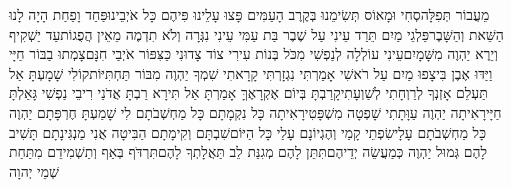 \documentclass[../main/main.tex]{subfiles}
\begin{document}
\begin{multicols*}{\ncols}
מֵעֲבוֹר תְּפִלָּה\PreVerseSpace{}סְחִי וּמָאוֹס תְּשִׂימֵנוּ בְּקֶרֶב הָעַמִּים \ClosedSection{}פָּצוּ עָלֵינוּ פִּיהֶם כָּל אֹיְבֵינוּ\PreVerseSpace{}פַּחַד וָפַחַת הָיָה לָנוּ הַשֵּׁאת וְהַשָּׁבֶר\PreVerseSpace{}פַּלְגֵי מַיִם תֵּרַד עֵינִי עַל שֶׁבֶר בַּת עַמִּי \ClosedSection{}עֵינִי נִגְּרָה וְלֹא תִדְמֶה מֵאֵין הֲפֻגוֹת\PreVerseSpace{}עַד יַשְׁקִיף וְיֵרֶא יַהְוֶה מִשָּׁמָיִם\PreVerseSpace{}עֵינִי עוֹלְלָה לְנַפְשִׁי מִכֹּל בְּנוֹת עִירִי \ClosedSection{}צוֹד צָדוּנִי כַּצִּפּוֹר אֹיְבַי חִנָּם\PreVerseSpace{}צָמְתוּ בַבּוֹר חַיָּי וַיַּדּוּ אֶבֶן בִּי\PreVerseSpace{}צָפוּ מַיִם עַל רֹאשִׁי אָמַרְתִּי נִגְזָרְתִּי \ClosedSection{}קָרָאתִי שִׁמְךָ יַהְוֶה מִבּוֹר תַּחְתִּיּוֹת\PreVerseSpace{}קוֹלִי שָׁמָעְתָּ אַל תַּעְלֵם אָזְנְךָ לְרַוְחָתִי לְשַׁוְעָתִי\PreVerseSpace{}קָרַבְתָּ בְּיוֹם אֶקְרָאֶךָּ אָמַרְתָּ אַל תִּירָא \ClosedSection{}רַבְתָּ אֲדֹנַי רִיבֵי נַפְשִׁי גָּאַלְתָּ חַיָּי\PreVerseSpace{}רָאִיתָה יַהְוֶה עַוָּתָתִי שָׁפְטָה מִשְׁפָּטִי\PreVerseSpace{}רָאִיתָה כָּל נִקְמָתָם כָּל מַחְשְׁבֹתָם לִי \ClosedSection{}שָׁמַעְתָּ חֶרְפָּתָם יַהְוֶה כָּל מַחְשְׁבֹתָם עָלָי\PreVerseSpace{}שִׂפְתֵי קָמַי וְהֶגְיוֹנָם עָלַי כָּל הַיּוֹם\PreVerseSpace{}שִׁבְתָּם וְקִימָתָם הַבִּיטָה אֲנִי מַנְגִּינָתָם \ClosedSection{}תָּשִׁיב לָהֶם גְּמוּל יַהְוֶה כְּמַעֲשֵׂה יְדֵיהֶם\PreVerseSpace{}תִּתֵּן לָהֶם מְגִנַּת לֵב תַּאֲלָתְךָ לָהֶם\PreVerseSpace{}תִּרְדֹּף בְּאַף וְתַשְׁמִידֵם מִתַּחַת שְׁמֵי יְהוָה\OpenSection{}\par

\end{multicols*}
\end{document}
